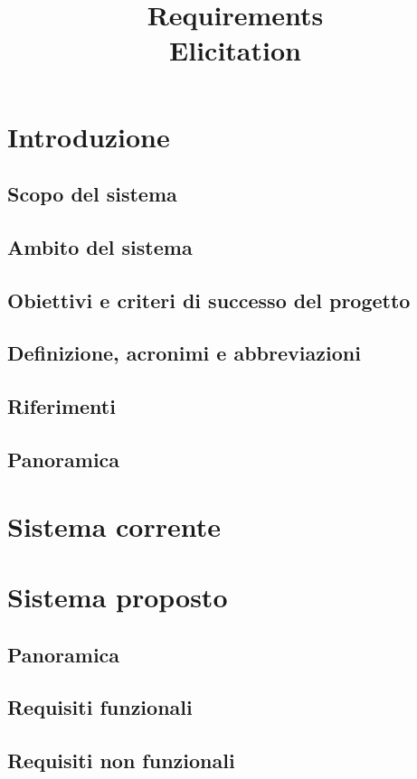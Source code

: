 \documentclass[12pt]{article}
\title{Requirements\\Elicitation}
\author{\presentatoda}
\begin{document}
\maketitle

\tableofcontents
\clearpage
\begin{versionhistory}
\end{versionhistory}
\clearpage

\section{Introduzione}
\subsection{Scopo del sistema}
\subsection{Ambito del sistema}
\subsection{Obiettivi e criteri di successo del progetto}
\subsection{Definizione, acronimi e abbreviazioni}
\subsection{Riferimenti}
\subsection{Panoramica}
\section{Sistema corrente}
\section{Sistema proposto}
\subsection{Panoramica}
\subsection{Requisiti funzionali}
\subsection{Requisiti non funzionali}
\end{document}
